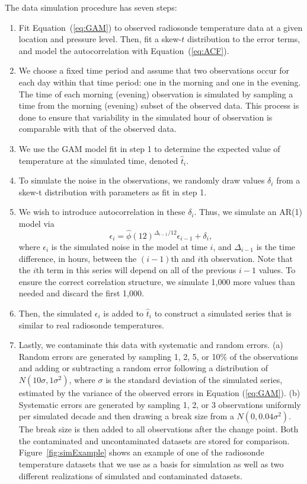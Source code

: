\documentclass[12pt]{article}
\begin{document}
\begin{doublespacing}
The data simulation procedure has seven steps:
\begin{enumerate}
	\item Fit Equation~(\ref{eq:GAM}) to observed radiosonde temperature data at a given location and pressure level.  Then, fit a skew-$t$ distribution to the error terms, and model the autocorrelation with Equation~(\ref{eq:ACF}).
	\item We choose a fixed time period and assume that two observations occur for each day within that time period: one in the morning and one in the evening.  The time of each morning (evening) observation is simulated by sampling a time from the morning (evening) subset of the observed data.  This process is done to ensure that variability in the simulated hour of observation is comparable with that of the observed data.
	\item We use the GAM model fit in step 1 to determine the expected value of temperature at the simulated time, denoted $\hat t_i$.
	\item To simulate the noise in the observations, we randomly draw values $\delta_i$ from a skew-t distribution with parameters as fit in step 1.
	\item We wish to introduce autocorrelation in these $\delta_i$.  Thus, we simulate an AR(1) model via
	\begin{equation*}
	\epsilon_i = \widehat{\phi}(12)^{\Delta_{i-1}/12} \epsilon_{i-1} + \delta_i,
	\end{equation*}
	where $\epsilon_i$ is the simulated noise in the model at time $i$, and $\Delta_{i-1}$ is the time difference, in hours, between the $(i-1)$th and $i$th observation.  Note that the $i$th term in this series will depend on all of the previous $i-1$ values.  To ensure the correct correlation structure, we simulate 1,000 more values than needed and discard the first 1,000.
	\item Then, the simulated $\epsilon_i$ is added to $\hat{t}_i$ to construct a simulated series that is similar to real radiosonde temperatures.
	
	\item Lastly, we contaminate this data with systematic and random errors.  (a) Random errors are generated by sampling 1, 2, 5, or 10\% of the observations and adding or subtracting a random error following a distribution of $N(10\sigma,1\sigma^2)$, where $\sigma$ is the standard deviation of the simulated series, estimated by the variance of the observed errors in Equation (\ref{eq:GAM}).  (b) Systematic errors are generated by sampling 1, 2, or 3 observations uniformly per simulated decade and then drawing a break size from a $N(0,0.04 \sigma^2)$.  The break size is then added to all observations after the change point.  Both the contaminated and uncontaminated datasets are stored for comparison.  Figure~\ref{fig:simExample} shows an example of one of the radiosonde temperature datasets that we use as a basis for simulation as well as two different realizations of simulated and contaminated datasets.
\end{enumerate}


\end{doublespacing}
\end{document}
